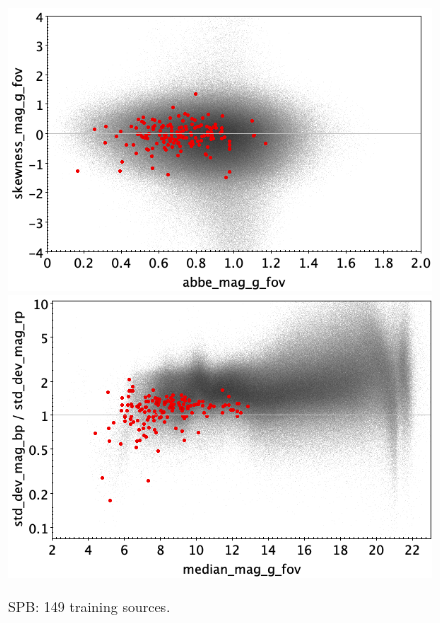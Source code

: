 \documentclass[longauth]{aa}
\begin{document}
\begin{appendix}
\begin{figure}
\vspace{4mm}
 \includegraphics[width=0.45\hsize]{figures/appendix/SPB_trn_ask.png}  %
\hspace{2mm}
 \includegraphics[width=0.45\hsize]{figures/appendix/SPB_trn_msdr.png}  \\ %
\vspace{4mm}
 \caption{SPB: 149 training sources.}  
 \label{fig:app:SPB_trn}
\end{figure}


\end{appendix}
\end{document}
